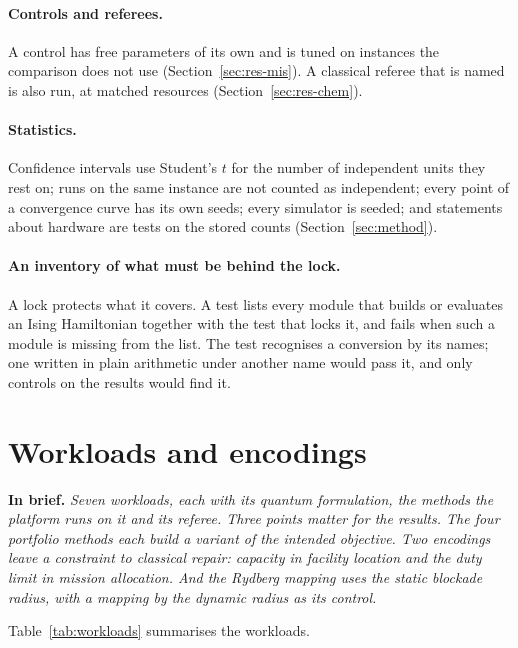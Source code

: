 \documentclass[11pt,a4paper]{article}
\newcommand{\inbrief}[1]{\par\smallskip\noindent\textbf{In brief.} \emph{#1}\par\medskip}
\begin{document}
\paragraph{Controls and referees.} A control has free parameters of its own
and is tuned on instances the comparison does not use
(Section~\ref{sec:res-mis}). A classical referee that is named is also run,
at matched resources (Section~\ref{sec:res-chem}).

\paragraph{Statistics.} Confidence intervals use Student's $t$ for the
number of independent units they rest on; runs on the same instance are not
counted as independent; every point of a convergence curve has its own
seeds; every simulator is seeded; and statements about hardware are tests on
the stored counts (Section~\ref{sec:method}).

\paragraph{An inventory of what must be behind the lock.} A lock protects
what it covers. A test lists every module that builds or evaluates an Ising
Hamiltonian together with the test that locks it, and fails when such a
module is missing from the list. The test recognises a conversion by its
names; one written in plain arithmetic
under another name would pass it, and only controls on the results would
find it.

\section{Workloads and encodings}
\label{sec:workloads}

\inbrief{Seven workloads, each with its quantum formulation, the methods the
platform runs on it and its referee. Three points matter for the results.
The four portfolio methods each build a variant of the intended
objective. Two encodings leave a constraint to classical repair: capacity in
facility location and the duty limit in mission allocation. And the Rydberg
mapping uses the static blockade radius, with a mapping by the dynamic
radius as its control.}

Table~\ref{tab:workloads} summarises the workloads.
\end{document}
